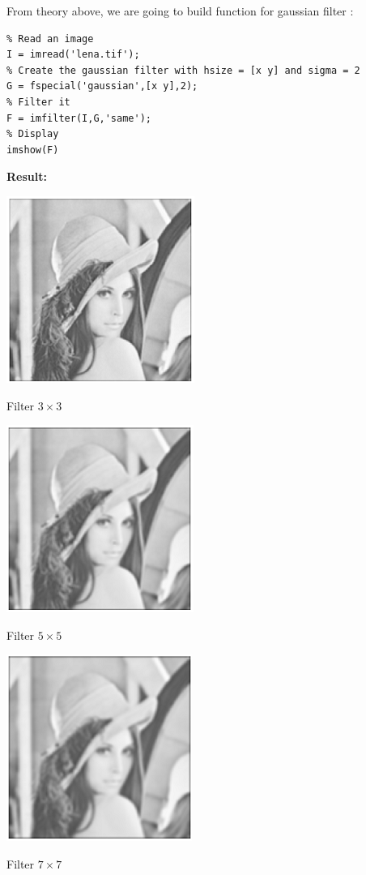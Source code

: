 \documentclass[10pt]{article}
\begin{document}
From theory above, we are going to build function for gaussian filter :
\begin{lstlisting}
% Read an image
I = imread('lena.tif');
% Create the gaussian filter with hsize = [x y] and sigma = 2
G = fspecial('gaussian',[x y],2);
% Filter it
F = imfilter(I,G,'same');
% Display
imshow(F)	
\end{lstlisting}
\textbf{Result:}
\begin{center}
	\includegraphics{b3x3.png}
	
	Filter $3\times3$
	
	\includegraphics{b5x5.png}
	
	Filter $5\times5$
	
	\includegraphics{b7x7.png}
	
	Filter $7\times7$
\end{center}
\end{document}
